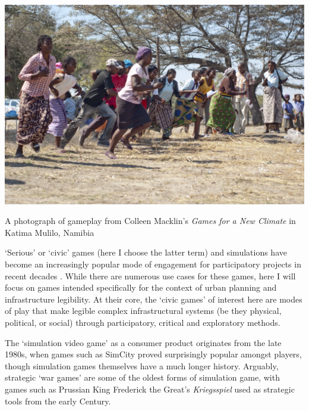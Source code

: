\documentclass[nofonts,nols,justified,nobib]{tufte-book}
\begin{document}
\begin{marginfigure}
\includegraphics[width=\textwidth]{img/1/macklin-climate.jpg}
\caption{A photograph of gameplay from Colleen Macklin's \emph{Games for a New Climate} in Katima Mulilo, Namibia \cite{macklin_games_2013}}
\end{marginfigure}

`Serious' or `civic' games (here I choose the latter term) and simulations have become an increasingly popular mode of engagement for participatory projects in recent decades \cite{krivy_participatory_2013}. While there are numerous use cases for these games, here I will focus on games intended specifically for the context of urban planning and infrastructure legibility. At their core, the `civic games' of interest here are modes of play that make legible complex infrastructural systems (be they physical, political, or social) through participatory, critical and exploratory methods.

The `simulation video game' as a consumer product originates from the late 1980s, when games such as SimCity proved surprisingly popular amongst players, though simulation games themselves have a much longer history. Arguably, strategic `war games' are some of the oldest forms of simulation game, with games such as Prussian King Frederick the Great's \emph{Kriegsspiel} used as strategic tools from the early  Century. \cite{landa_war_1991}
\end{document}
